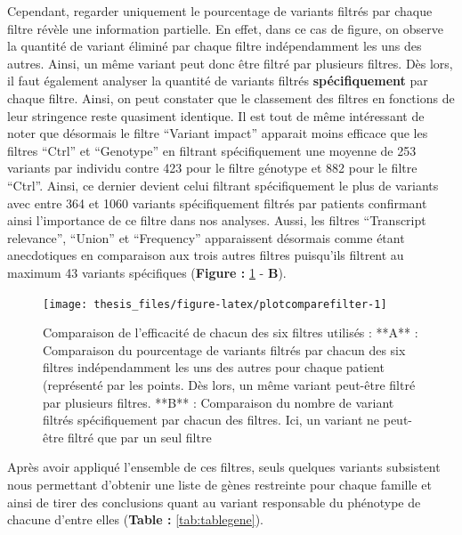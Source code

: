 \documentclass[12pt,twoside]{reedthesis}
\theoremstyle{definition}
\theoremstyle{definition}
\theoremstyle{remark}
\begin{document}
  Cependant, regarder uniquement le pourcentage de variants filtrés par
  chaque filtre révèle une information partielle. En effet, dans ce cas de
  figure, on observe la quantité de variant éliminé par chaque filtre
  indépendamment les uns des autres. Ainsi, un même variant peut donc être
  filtré par plusieurs filtres. Dès lors, il faut également analyser la
  quantité de variants filtrés \textbf{spécifiquement} par chaque filtre.
  Ainsi, on peut constater que le classement des filtres en fonctions de
  leur stringence reste quasiment identique. Il est tout de même
  intéressant de noter que désormais le filtre ``Variant impact'' apparait
  moins efficace que les filtres ``Ctrl'' et ``Genotype'' en filtrant
  spécifiquement une moyenne de 253 variants par individu contre 423 pour
  le filtre génotype et 882 pour le filtre ``Ctrl''. Ainsi, ce dernier
  devient celui filtrant spécifiquement le plus de variants avec entre 364
  et 1060 variants spécifiquement filtrés par patients confirmant ainsi
  l'importance de ce filtre dans nos analyses. Aussi, les filtres
  ``Transcript relevance'', ``Union'' et ``Frequency'' apparaissent
  désormais comme étant anecdotiques en comparaison aux trois autres
  filtres puisqu'ils filtrent au maximum 43 variants spécifiques
  (\textbf{Figure :} \ref{fig:plotcomparefilter} - \textbf{B}).
  
  \newpage
  
  \begin{figure}
  
  {\centering \texttt{[image: thesis\_files/figure-latex/plotcomparefilter-1]} 
  
  }
  
  \caption[Comparaison de l'efficacité de chacun des six filtres utilisés]{Comparaison de l'efficacité de chacun des six filtres utilisés : **A** : Comparaison du pourcentage de variants filtrés par chacun des six filtres indépendamment les uns des autres pour chaque patient (représenté par les points. Dès lors, un même variant peut-être filtré par plusieurs filtres. **B** : Comparaison du nombre de variant filtrés spécifiquement par chacun des filtres. Ici, un variant ne peut-être filtré que par un seul filtre}\label{fig:plotcomparefilter}
  \end{figure}
  
  \newpage
  
  Après avoir appliqué l'ensemble de ces filtres, seuls quelques variants
  subsistent nous permettant d'obtenir une liste de gènes restreinte pour
  chaque famille et ainsi de tirer des conclusions quant au variant
  responsable du phénotype de chacune d'entre elles (\textbf{Table :
  }\ref{tab:tablegene}).
  
\end{document}
